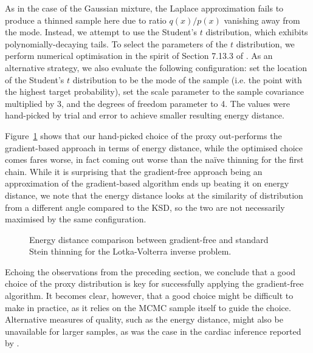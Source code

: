 \documentclass[11pt,a4paper]{report}
\begin{document}
As in the case of the Gaussian mixture, the Laplace approximation fails to produce a thinned sample here due to ratio $q(x) / p(x)$ vanishing away from the mode. Instead, we attempt to use the Student's $t$ distribution, which exhibits polynomially-decaying tails. To select the parameters of the $t$ distribution, we perform numerical optimisation in the spirit of Section 7.13.3 of \cite{ruppertStatisticsDataAnalysis2015}. As an alternative strategy, we also evaluate the following configuration: set the location of the Student's $t$ distribution to be the mode of the sample (i.e. the point with the highest target probability), set the scale parameter to the sample covariance multiplied by 3, and the degrees of freedom parameter to 4. The values were hand-picked by trial and error to achieve smaller resulting energy distance.

Figure~\ref{fig:lotka-volterra:gf-thinning:energy-distance} shows that our hand-picked choice of the proxy out-performs the gradient-based approach in terms of energy distance, while the optimised choice comes fares worse, in fact coming out worse than the na\"ive thinning for the first chain. While it is surprising that the gradient-free approach being an approximation of the gradient-based algorithm ends up beating it on energy distance, we note that the energy distance looks at the similarity of distribution from a different angle compared to the KSD, so the two are not necessarily maximised by the same configuration. 


\begin{figure}[h]
\centering
{}
\caption{Energy distance comparison between gradient-free and standard Stein thinning for the Lotka-Volterra inverse problem.
\label{fig:lotka-volterra:gf-thinning:energy-distance}}
\end{figure}

Echoing the observations from the preceding section, we conclude that a good choice of the proxy distribution is key for successfully applying the gradient-free algorithm. It becomes clear, however, that a good choice might be difficult to make in practice, as it relies on the MCMC sample itself to guide the choice. Alternative measures of quality, such as the energy distance, might also be unavailable for larger samples, as was the case in the cardiac inference reported by \cite{riabizOptimalThinningMCMC2022}.
\end{document}
